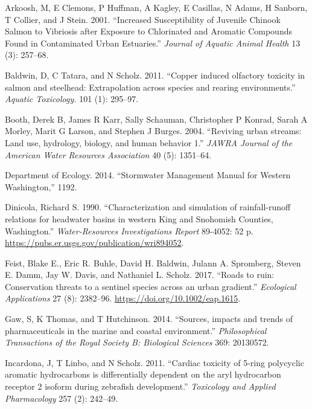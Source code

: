 \documentclass[
]{report}
\begin{document}
\leavevmode\hypertarget{ref-Arkoosh2001}{}%
Arkoosh, M, E Clemons, P Huffman, A Kagley, E Casillas, N Adams, H Sanborn, T Collier, and J Stein. 2001. ``Increased Susceptibility of Juvenile Chinook Salmon to Vibriosis after Exposure to Chlorinated and Aromatic Compounds Found in Contaminated Urban Estuaries.'' \emph{Journal of Aquatic Animal Health} 13 (3): 257--68.

\leavevmode\hypertarget{ref-Baldwin2011}{}%
Baldwin, D, C Tatara, and N Scholz. 2011. ``Copper induced olfactory toxicity in salmon and steelhead: Extrapolation across species and rearing environments.'' \emph{Aquatic Toxicology.} 101 (1): 295--97.

\leavevmode\hypertarget{ref-booth2004reviving}{}%
Booth, Derek B, James R Karr, Sally Schauman, Christopher P Konrad, Sarah A Morley, Marit G Larson, and Stephen J Burges. 2004. ``Reviving urban streams: Land use, hydrology, biology, and human behavior 1.'' \emph{JAWRA Journal of the American Water Resources Association} 40 (5): 1351--64.

\leavevmode\hypertarget{ref-DepartmentofEcology2014}{}%
Department of Ecology. 2014. ``Stormwater Management Manual for Western Washington,'' 1192.

\leavevmode\hypertarget{ref-Dinicola1990}{}%
Dinicola, Richard S. 1990. ``Characterization and simulation of rainfall-runoff relations for headwater basins in western King and Snohomish Counties, Washington.'' \emph{Water-Resources Investigations Report} 89-4052: 52 p. \url{https://pubs.er.usgs.gov/publication/wri894052}.

\leavevmode\hypertarget{ref-Feist2017}{}%
Feist, Blake E., Eric R. Buhle, David H. Baldwin, Julann A. Spromberg, Steven E. Damm, Jay W. Davis, and Nathaniel L. Scholz. 2017. ``Roads to ruin: Conservation threats to a sentinel species across an urban gradient.'' \emph{Ecological Applications} 27 (8): 2382--96. \url{https://doi.org/10.1002/eap.1615}.

\leavevmode\hypertarget{ref-Gaw2014}{}%
Gaw, S, K Thomas, and T Hutchinson. 2014. ``Sources, impacts and trends of pharmaceuticals in the marine and coastal environment.'' \emph{Philosophical Transactions of the Royal Society B: Biological Sciences} 369: 20130572.

\leavevmode\hypertarget{ref-Incardona2011}{}%
Incardona, J, T Linbo, and N Scholz. 2011. ``Cardiac toxicity of 5-ring polycyclic aromatic hydrocarbons is differentially dependent on the aryl hydrocarbon receptor 2 isoform during zebrafish development.'' \emph{Toxicology and Applied Pharmacology} 257 (2): 242--49.
\end{document}
